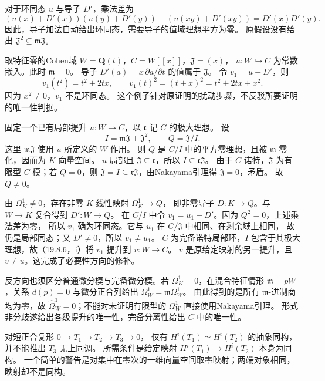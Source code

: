对于环同态 $u$ 与导子 $D'$，乘法差为
\[
 (u(x)+D'(x))(u(y)+D'(y))-(u(xy)+D'(xy))=D'(x)D'(y).
\]
因此，导子加法自动给出环同态，需要导子的值域理想平方为零。
原假设没有给出 $\mathfrak J^2\subseteq\mathfrak m\mathfrak J$。

取特征零的Cohen域 $W=\mathbf Q(t)$，$C=W[[x]]$，$\mathfrak J=(x)$，
$u:W\hookrightarrow C$ 为常数嵌入。此时 $\mathfrak m=0$。
导子 $D'(a)=x\,\partial a/\partial t$ 的值属于 $\mathfrak J$。
令 $v_1=u+D'$，则
\[
 v_1(t^2)=t^2+2tx,
 \qquad v_1(t)^2=(t+x)^2=t^2+2tx+x^2.
\]
因为 $x^2\ne0$，$v_1$ 不是环同态。
这个例子针对原证明的扰动步骤，不反驳所要证明的唯一性判据。

固定一个已有局部提升 $u:W\to C$，以 $\mathfrak r$ 记 $C$ 的极大理想。
设
\[
 I=\mathfrak m\mathfrak J+\mathfrak J^2,
 \qquad Q=\mathfrak J/I.
\]
这里 $\mathfrak m\mathfrak J$ 使用 $u$ 所定义的 $W$-作用。
则 $Q$ 是 $C/I$ 中的平方零理想，且被 $\mathfrak m$ 零化，因而为 $K$-向量空间。
$u$ 局部且 $\mathfrak J\subseteq\mathfrak r$，所以
$I\subseteq\mathfrak r\mathfrak J$。
由于 $C$ 诺特，$\mathfrak J$ 为有限型 $C$-模；若 $Q=0$，则
$\mathfrak J=I\subseteq\mathfrak r\mathfrak J$，由Nakayama引理得 $\mathfrak J=0$，矛盾。
故 $Q\ne0$。

由 $\Omega^1_K\ne0$，存在非零 $K$-线性映射 $\Omega^1_K\to Q$，
即非零导子 $D:K\to Q$。与 $W\to K$ 复合得到 $D':W\to Q$。
在 $C/I$ 中令 $v_1=u_1+D'$。因为 $Q^2=0$，上述乘法差为零，
所以 $v_1$ 确为环同态。它与 $u_1$ 在 $C/\mathfrak J$ 中相同、在剩余域上相同，
故仍是局部同态；又 $D'\ne0$，所以 $v_1\ne u_1$。
$C$ 为完备诺特局部环，$I$ 包含于其极大理想，故（19.8.6，i）将 $v_1$ 提升到 $v:W\to C$。
$v$ 是原给定映射的另一提升，且 $v\ne u$。这完成了必要性方向的修补。

反方向也须区分普通微分模与完备微分模。若 $\Omega^1_K=0$，在混合特征情形
$\mathfrak m=pW$，关系 $d(p)=0$ 与微分正合列给出
$\Omega^1_W=\mathfrak m\Omega^1_W$。
由此得到的是所有 $\mathfrak m$-进制商均为零，故
$\widehat\Omega^1_W=0$；不能对未证明有限型的 $\Omega^1_W$ 直接使用Nakayama引理。
形式非分歧遂给出各级提升的唯一性，完备分离性给出 $C$ 中的唯一性。

对短正合复形 $0\to T_1\to T_2\to T_3\to0$，
仅有 $H^i(T_1)\simeq H^i(T_2)$ 的抽象同构，并不能推出 $T_3$ 无上同调。
所需条件是给定映射 $H^i(T_1)\to H^i(T_2)$ 本身为同构。
一个简单的警告是对集中在零次的一维向量空间取零映射；两端对象相同，映射却不是同构。

